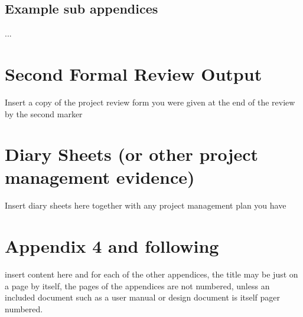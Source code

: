\documentclass[12pt,a4paper]{article}
\begin{document}
\newpage
\begin{appendices}
\begin{minipage}{\textwidth}
	
\end{minipage}

\begin{subappendices}

\subsection{Example sub appendices}
...
\end{subappendices}

\section{Second Formal Review Output}
Insert a copy of the project review form you were given at the end of the review by the second marker

\section{Diary Sheets (or other project management evidence)}
Insert diary sheets here together with any project management plan you have

\section{Appendix 4 and following}
insert content here and for each of the other appendices, the title may be just on a page by itself, the pages of the appendices are not numbered, unless an included document such as a user manual or design document is itself pager numbered.
\end{appendices}
\end{document}
